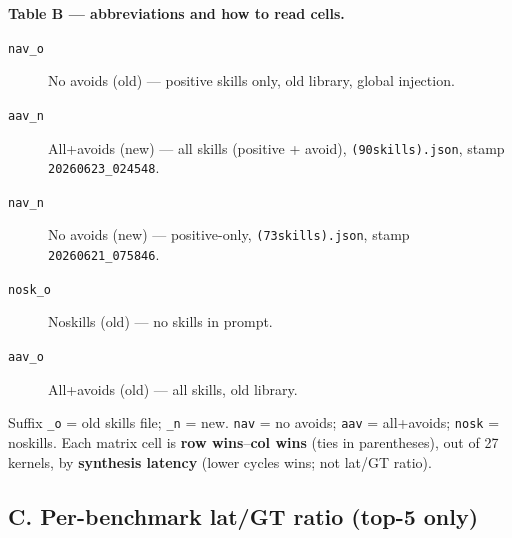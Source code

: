 \documentclass[11pt]{article}
\begin{document}
\medskip
\noindent\textbf{Table B --- abbreviations and how to read cells.}
\begin{description}
  \item[\texttt{nav\_o}] No avoids (old) --- positive skills only, old library, global injection.
  \item[\texttt{aav\_n}] All+avoids (new) --- all skills (positive + avoid), \texttt{(90skills).json}, stamp \texttt{20260623\_024548}.
  \item[\texttt{nav\_n}] No avoids (new) --- positive-only, \texttt{(73skills).json}, stamp \texttt{20260621\_075846}.
  \item[\texttt{nosk\_o}] Noskills (old) --- no skills in prompt.
  \item[\texttt{aav\_o}] All+avoids (old) --- all skills, old library.
\end{description}
\noindent Suffix \texttt{\_o} = old skills file; \texttt{\_n} = new.
\texttt{nav} = no avoids; \texttt{aav} = all+avoids; \texttt{nosk} = noskills.
Each matrix cell is \textbf{row wins}--\textbf{col wins} (ties in parentheses), out of 27 kernels, by \textbf{synthesis latency} (lower cycles wins; not lat/GT ratio).

\subsection*{C. Per-benchmark lat/GT ratio (top-5 only)}
\end{document}
